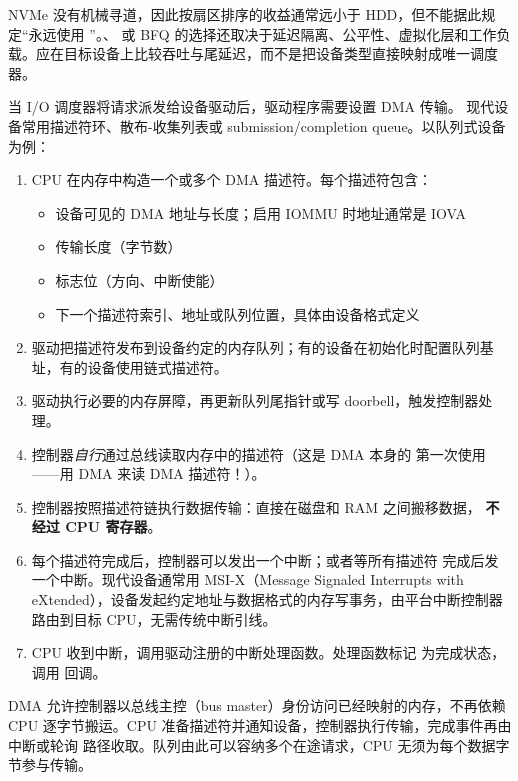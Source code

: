 \begin{filesystemlayout}
\begin{warningbox}
NVMe 没有机械寻道，因此按扇区排序的收益通常远小于 HDD，但不能据此规定“永远使用 ”。、 或 BFQ 的选择还取决于延迟隔离、公平性、虚拟化层和工作负载。应在目标设备上比较吞吐与尾延迟，而不是把设备类型直接映射成唯一调度器。
\end{warningbox}


当 I/O 调度器将请求派发给设备驱动后，驱动程序需要设置 DMA 传输。
现代设备常用描述符环、散布-收集列表或 submission/completion queue。以队列式设备为例：

\begin{enumerate}\tightlist
\item CPU 在内存中构造一个或多个 DMA 描述符。每个描述符包含：
  \begin{itemize}\tightlist
  \item 设备可见的 DMA 地址与长度；启用 IOMMU 时地址通常是 IOVA
  \item 传输长度（字节数）
  \item 标志位（方向、中断使能）
  \item 下一个描述符索引、地址或队列位置，具体由设备格式定义
  \end{itemize}
\item 驱动把描述符发布到设备约定的内存队列；有的设备在初始化时配置队列基址，有的设备使用链式描述符。
\item 驱动执行必要的内存屏障，再更新队列尾指针或写 doorbell，触发控制器处理。
\item 控制器\emph{自行}通过总线读取内存中的描述符（这是 DMA 本身的
  第一次使用——用 DMA 来读 DMA 描述符！）。
\item 控制器按照描述符链执行数据传输：直接在磁盘和 RAM 之间搬移数据，
  \textbf{不经过 CPU 寄存器}。
\item 每个描述符完成后，控制器可以发出一个中断；或者等所有描述符
  完成后发一个中断。现代设备通常用 MSI-X（Message Signaled Interrupts
  with eXtended），设备发起约定地址与数据格式的内存写事务，由平台中断控制器路由到目标 CPU，无需传统中断引线。
\item CPU 收到中断，调用驱动注册的中断处理函数。处理函数标记
   为完成状态，调用  回调。
\end{enumerate}

DMA 允许控制器以总线主控（bus master）身份访问已经映射的内存，不再依赖 CPU
逐字节搬运。CPU 准备描述符并通知设备，控制器执行传输，完成事件再由中断或轮询
路径收取。队列由此可以容纳多个在途请求，CPU 无须为每个数据字节参与传输。


\end{filesystemlayout}
